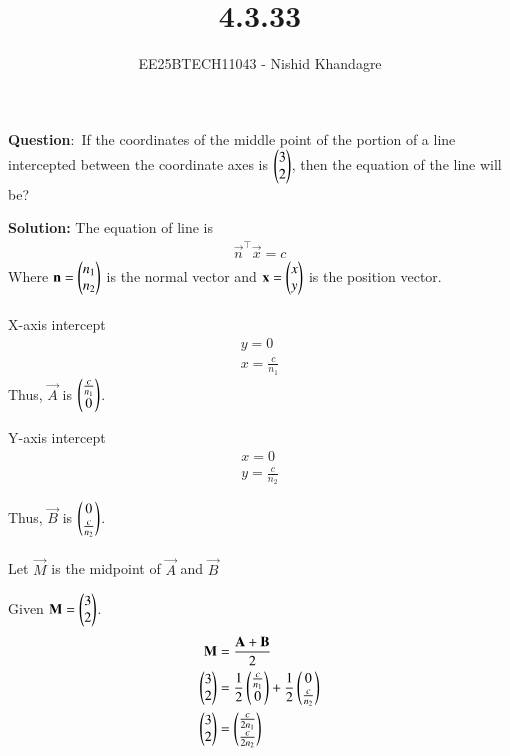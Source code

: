 \documentclass[journal]{IEEEtran}
\title{4.3.33}
\author{EE25BTECH11043 - Nishid Khandagre}
\begin{document}
\maketitle

\renewcommand{\thefigure}{\theenumi}
\renewcommand{\thetable}{\theenumi}


\textbf{Question}:\
If the coordinates of the middle point of the portion of a line intercepted between the
coordinate axes is $\begin{pmatrix}3\\2\end{pmatrix}$, then the equation of the line will be?

\textbf{Solution: }
The equation of line is
\begin{align}
\vec{n}^\top\vec{x} = c
\end{align}
Where $\mathbf{n} = \begin{pmatrix}n_1 \\ n_2\end{pmatrix}$ is the normal vector and $\mathbf{x} = \begin{pmatrix}x \\ y\end{pmatrix}$ is the position vector.\\ \\




X-axis intercept
\begin{align}
 y=0\\
x = \frac{c}{n_1}
\end{align}
Thus, $\vec{A}$ is $\begin{pmatrix}\frac{c}{n_1} \\ 0\end{pmatrix}$.


Y-axis intercept
\begin{align}
x=0\\
y = \frac{c}{n_2}
\end{align}

Thus, $\vec{B}$ is $\begin{pmatrix}0 \\ \frac{c}{n_2}\end{pmatrix}$.\\ \\

Let $\vec{M}$ is the midpoint of $\vec{A}$ and $\vec{B}$

Given $\mathbf{M} = \begin{pmatrix}3 \\ 2\end{pmatrix}$.
\begin{align}
\mathbf{M} &= \frac{\mathbf{A} + \mathbf{B}}{2} \\
\begin{pmatrix}3\\2\end{pmatrix}&= \frac{1}{2} \begin{pmatrix}\frac{c}{n_1} \\ 0\end{pmatrix} + \frac{1}{2} \begin{pmatrix}0 \\ \frac{c}{n_2}\end{pmatrix} \\
\begin{pmatrix}3\\2\end{pmatrix}&= \begin{pmatrix}\frac{c}{2n_1} \\ \frac{c}{2n_2}\end{pmatrix}
\end{align}
\end{document}
